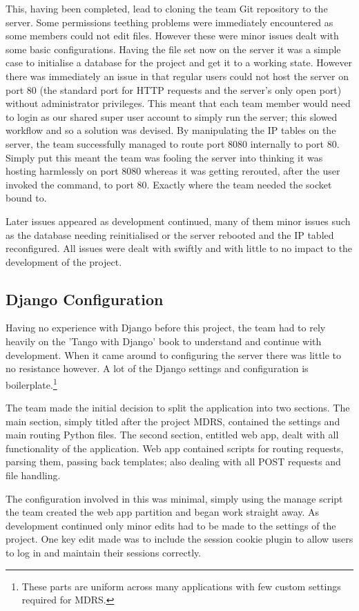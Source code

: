 \documentclass{l3proj}
\begin{document}
This, having been completed, lead to cloning the team Git repository to the server. Some permissions teething problems were immediately encountered as some members could not edit files. However these were minor issues dealt with some basic configurations.
Having the file set now on the server it was a simple case to initialise a database for the project and get it to a working state. However there was immediately an issue in that regular users could not host the server on port 80 (the standard port for HTTP requests and the server's only open port) without administrator privileges. This meant that each team member would need to login as our shared super user account to simply run the server; this slowed workflow and so a solution was devised. By manipulating the IP tables on the server, the team successfully managed to route port 8080 internally to port 80. Simply put this meant the team was fooling the server into thinking it was hosting harmlessly on port 8080 whereas it was getting rerouted, after the user invoked the command, to port 80. Exactly where the team needed the socket bound to.

Later issues appeared as development continued, many of them minor issues such as the database needing reinitialised or the server rebooted and the IP tabled reconfigured. All issues were dealt with swiftly and with little to no impact to the development of the project.

\subsection{Django Configuration}		Having no experience with Django before this project, the team had to rely heavily on the 'Tango with Django' book\cite{tangoWithDjango} to understand and continue with development. When it came around to configuring the server there was little to no resistance however. A lot of the Django settings and configuration is boilerplate.\footnote{These parts are uniform across many applications with few custom settings required for MDRS.}

The team made the initial decision to split the application into two sections. The main section, simply titled after the project MDRS, contained the settings and main routing \gls{Python} files. The second section, entitled web app, dealt with all functionality of the application. Web app contained scripts for routing requests, parsing them, passing back templates; also dealing with all POST requests and file handling.

The configuration involved in this was minimal, simply using the manage script the team created the web app partition and began work straight away. As development continued only minor edits had to be made to the settings of the project. One key edit made was to include the session cookie plugin to allow users to log in and maintain their sessions correctly.
\end{document}
